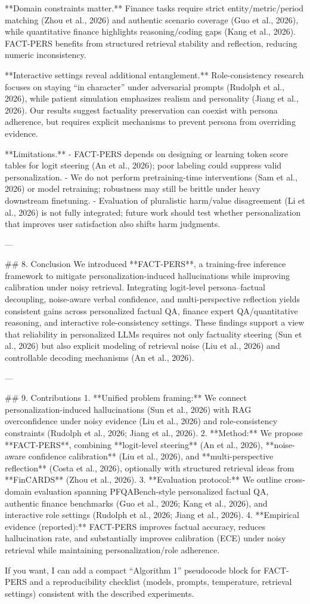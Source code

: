 **Domain constraints matter.** Finance tasks require strict entity/metric/period matching (Zhou et al., 2026) and authentic scenario coverage (Guo et al., 2026), while quantitative finance highlights reasoning/coding gaps (Kang et al., 2026). FACT-PERS benefits from structured retrieval stability and reflection, reducing numeric inconsistency.

**Interactive settings reveal additional entanglement.** Role-consistency research focuses on staying “in character” under adversarial prompts (Rudolph et al., 2026), while patient simulation emphasizes realism and personality (Jiang et al., 2026). Our results suggest factuality preservation can coexist with persona adherence, but requires explicit mechanisms to prevent persona from overriding evidence.

**Limitations.**  
- FACT-PERS depends on designing or learning token score tables for logit steering (An et al., 2026); poor labeling could suppress valid personalization.  
- We do not perform pretraining-time interventions (Sam et al., 2026) or model retraining; robustness may still be brittle under heavy downstream finetuning.  
- Evaluation of pluralistic harm/value disagreement (Li et al., 2026) is not fully integrated; future work should test whether personalization that improves user satisfaction also shifts harm judgments.

---

## 8. Conclusion  
We introduced **FACT-PERS**, a training-free inference framework to mitigate personalization-induced hallucinations while improving calibration under noisy retrieval. Integrating logit-level persona–factual decoupling, noise-aware verbal confidence, and multi-perspective reflection yields consistent gains across personalized factual QA, finance expert QA/quantitative reasoning, and interactive role-consistency settings. These findings support a view that reliability in personalized LLMs requires not only factuality steering (Sun et al., 2026) but also explicit modeling of retrieval noise (Liu et al., 2026) and controllable decoding mechanisms (An et al., 2026).

---

## 9. Contributions  
1. **Unified problem framing:** We connect personalization-induced hallucinations (Sun et al., 2026) with RAG overconfidence under noisy evidence (Liu et al., 2026) and role-consistency constraints (Rudolph et al., 2026; Jiang et al., 2026).  
2. **Method:** We propose **FACT-PERS**, combining **logit-level steering** (An et al., 2026), **noise-aware confidence calibration** (Liu et al., 2026), and **multi-perspective reflection** (Costa et al., 2026), optionally with structured retrieval ideas from **FinCARDS** (Zhou et al., 2026).  
3. **Evaluation protocol:** We outline cross-domain evaluation spanning PFQABench-style personalized factual QA, authentic finance benchmarks (Guo et al., 2026; Kang et al., 2026), and interactive role settings (Rudolph et al., 2026; Jiang et al., 2026).  
4. **Empirical evidence (reported):** FACT-PERS improves factual accuracy, reduces hallucination rate, and substantially improves calibration (ECE) under noisy retrieval while maintaining personalization/role adherence.

If you want, I can add a compact “Algorithm 1” pseudocode block for FACT-PERS and a reproducibility checklist (models, prompts, temperature, retrieval settings) consistent with the described experiments.